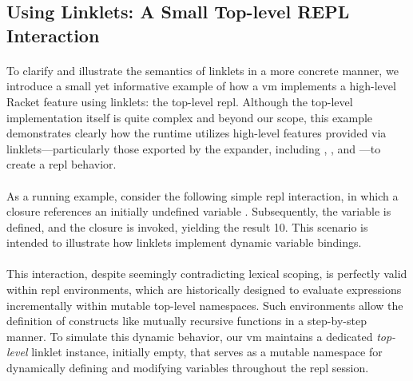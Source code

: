 		\subsection{Using Linklets: A Small Top-level REPL Interaction}

		\paragraph{}%
			To clarify and illustrate the semantics of linklets in a more concrete manner, we introduce a small yet informative example of how a \gls{vm} implements a high-level Racket feature using linklets: the top-level \gls{repl}. Although the top-level implementation itself is quite complex and beyond our scope, this example demonstrates clearly how the runtime utilizes high-level features provided via linklets—particularly those exported by the expander, including , , and —to create a \gls{repl} behavior.

		\paragraph{}%
			As a running example, consider the following simple \gls{repl} interaction, in which a closure  references an initially undefined variable . Subsequently, the variable  is defined, and the closure is invoked, yielding the result 10. This scenario is intended to illustrate how linklets implement dynamic variable bindings.


		\paragraph{}%
			This interaction, despite seemingly contradicting lexical scoping, is perfectly valid within \gls{repl} environments, which are historically designed to evaluate expressions incrementally within mutable top-level namespaces. Such environments allow the definition of constructs like mutually recursive functions in a step-by-step manner. To simulate this dynamic behavior, our \gls{vm} maintains a dedicated \emph{top-level} linklet instance, initially empty, that serves as a mutable namespace for dynamically defining and modifying variables throughout the \gls{repl} session.

